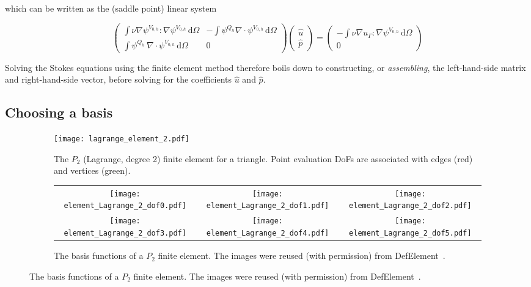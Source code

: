 \documentclass[thesis]{subfiles}
\begin{document}
which can be written as the (saddle point) linear system

\begin{equation}
  \left (
  \begin{array}{c|c}
    \int \nu \nabla \psi^{V_{0,h}} : \nabla \psi^{V_{0,h}} \, \textrm{d}\Omega
    &
    - \int \psi^{Q_h} \nabla \cdot \psi^{V_{0,h}} \, \textrm{d}\Omega \\
    \hline
    \int \psi^{Q_h} \, \nabla \cdot \psi^{V_{0,h}} \, \textrm{d}\Omega
    &
    0
  \end{array}
  \right )
  \left (
  \begin{array}{c}
    \hat u \\
    \hline
    \hat p
  \end{array}
  \right )
  =
  \left (
  \begin{array}{c}
    - \int \nu \nabla u_\Gamma : \nabla \psi^{V_{0,h}} \, \textrm{d}\Omega \\
    \hline
    0
  \end{array}
  \right )
  \label{eq:stokes_linear_system}
\end{equation}

Solving the Stokes equations using the finite element method therefore boils down to constructing, or \textit{assembling}, the left-hand-side matrix and right-hand-side vector, before solving for the coefficients $\hat u$ and $\hat p$.

\subsection{Choosing a basis}


\begin{figure}
  \centering
  \begin{subfigure}{.4\textwidth}
    \centering
    \texttt{[image: lagrange\_element\_2.pdf]}
    \vspace{1em}
    \caption{
      The $P_2$ (Lagrange, degree 2) finite element for a triangle.
      Point evaluation DoFs are associated with edges (red) and vertices (green).
    }
    \label{fig:lagrange_element_2}
  \end{subfigure}
  \begin{subfigure}{.58\textwidth}
    \centering
    \begin{tabular}{c c c}
      \texttt{[image: element\_Lagrange\_2\_dof0.pdf]}
      &
      \texttt{[image: element\_Lagrange\_2\_dof1.pdf]}
      &
      \texttt{[image: element\_Lagrange\_2\_dof2.pdf]}
      \\
      \texttt{[image: element\_Lagrange\_2\_dof3.pdf]}
      &
      \texttt{[image: element\_Lagrange\_2\_dof4.pdf]}
      &
      \texttt{[image: element\_Lagrange\_2\_dof5.pdf]}
    \end{tabular}
    \caption{
      The basis functions of a $P_2$ finite element.
      The images were reused (with permission) from DefElement~\cite{defelement}.
    }
    \label{fig:lagrange_element_2_basis}
  \end{subfigure}
\end{figure}
\end{document}
